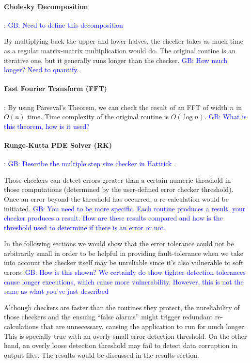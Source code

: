 \documentclass[prodmode,acmtecs]{acmsmall} %
\newcommand{\greg}[1]{%
  \textcolor{blue}{GB: #1}
}
\begin{document}
\paragraph{Cholesky Decomposition}: \greg{Need to define this decomposition}
By multiplying back the upper and lower halves, the checker takes as much time as a regular matrix-matrix multiplication would do. The original routine is an iterative one, but it generally runs longer than the checker. \greg{How much longer? Need to quantify.}

\paragraph{Fast Fourier Transform (FFT)}:
By using Parseval's Theorem, we can check the result of an FFT of width $n$ in $O(n)$ time. Time complexity of the original routine is $O(\log{n})$.
\greg{What is this theorem, how is it used?}

\paragraph{Runge-Kutta PDE Solver (RK)}:
\greg{Describe the multiple step size checker in Hattrick}.

Those checkers can detect errors greater than a certain numeric threshold in those computations (determined by the user-defined error checker threshold). Once an error beyond the threshold has occurred, a re-calculation would be initiated.
\greg{You need to be more specific. Each routine produces a result, your checker produces a result. How are these results compared and how is the threshold used to determine if there is an error or not.}

In the following sections we would show that the error tolerance could not be arbitrarily small in order to be helpful in providing fault-tolerance when we take into account the checker itself may be unreliable since it's also vulnerable to soft errors.
\greg{How is this shown? We certainly do show tighter detection tolerances cause longer executions, which cause more vulnerability. However, this is not the same as what you've just described}

Although checkers are faster than the routines they protect, the unreliability of those checkers and the ensuing ``false alarms'' might trigger redundant re-calculations that are unnecessary, causing the application to run for much longer. This is specially true with an overly small error detection threshold. On the other hand, an overly loose detection threshold may fail to detect data corruption in output files. The results would be discussed in the results section.
\end{document}
